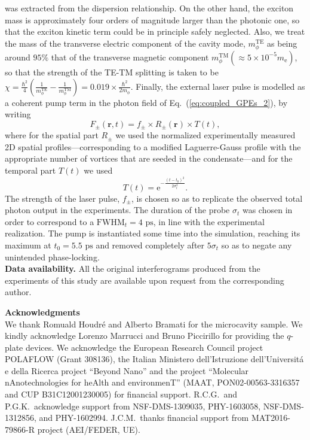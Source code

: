 \documentclass[aps,prb,twocolumn,superscriptaddress,nofootinbib]{revtex4}
\def\editr#1{#1}
\def\refer#1{#1}
\def\edstrike#1{}
\begin{document}
{was extracted from the dispersion relationship.
%
%
On the other hand, the exciton mass is approximately four orders of
magnitude larger than the photonic one, so that the exciton kinetic
term could be in principle safely neglected.
%
Also, we treat the mass of the transverse electric component of the cavity mode,
$m_\phi^\text{TE}$ as being around $95\%$ that of the transverse
magnetic component $m_\phi^\text{TM}(\approx5\times10^{-5}m_\text{e})$, so
that the strength of the TE-TM splitting is taken to be $\chi=
\frac{\hbar^2}{4}(\frac{1}{m_\phi^\text{TE}}-\frac{1}{m_\phi^\text{TM}})
= 0.019 \times\frac{\hbar^2}{2m_\phi}$.
%
Finally, the external laser pulse is modelled as a coherent pump term in the photon field of Eq.~(\ref{eq:coupled_GPEs_2}), by writing
%
\begin{equation}
F_\pm(\mathbf{r},t) = f_\pm \times R_{\pm}(\mathbf{r}) \times T(t),
\end{equation}
%
where for the spatial part $R_{\pm}$ we used the normalized experimentally
measured 2D spatial profiles---corresponding to a modified Laguerre-Gauss profile with the appropriate
number of vortices that are \edstrike{imprinted} \refer{seeded} in the condensate---and for the temporal part $T(t)$ we used
%
\begin{equation}
T(t) = \text{e}^{- \frac{\left(t-t_\text{0}\right)^2}{2\sigma_t^2} }.
\end{equation}
%
The strength of the laser pulse, $f_\pm$, is chosen so as to
replicate the observed total photon output in the experiments.
%
The duration of the probe $\sigma_t$ was chosen in order
to correspond to a $\text{FWHM}_t=4\text{ ps}$, in line
with the experimental realization.
%
The pump is instantiated some time
into the simulation, reaching its maximum at $t_\text{0}=5.5\text{ ps}$
and removed completely after $5\sigma_t$ so as to negate any
unintended phase-locking.\\

\noindent \editr{
\textbf{Data availability.} All the original interferograms 
produced from the experiments of this study 
are available upon request from the corresponding author.\\
}

}




\bigskip

\noindent \textbf{Acknowledgments}\\
We thank Romuald Houdr\'{e} and
Alberto Bramati for the microcavity sample.
%
We kindly acknowledge Lorenzo Marrucci and Bruno Piccirillo for providing the $q$-plate devices.
%
We acknowledge the European Research Council project POLAFLOW (Grant 308136),
the Italian Ministero dell'Istruzione dell'Universit\'{a} e della Ricerca project ``Beyond Nano''
and
the project ``Molecular nAnotechnologies for heAlth and environmenT''
(MAAT, PON02-00563-3316357 and CUP B31C12001230005)
for financial support.
%
R.C.G.~and P.G.K.~acknowledge support from NSF-DMS-1309035, PHY-1603058,
NSF-DMS-1312856, and PHY-1602994.
%
J.C.M.~thanks financial support from MAT2016-79866-R project (AEI/FEDER, UE).\\
\end{document}
